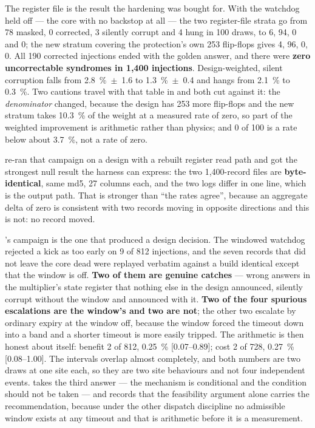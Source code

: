 The register file is the result the hardening was bought for. With the
watchdog held off --- the core with no backstop at all --- the two
register-file strata go from 78 masked, 0 corrected, 3 silently corrupt
and 4 hung in 100 draws, to 6, 94, 0 and 0; the new stratum covering the
protection's own 253 flip-flops gives 4, 96, 0, 0. All 190 corrected
injections ended with the golden answer, and there were \textbf{zero
uncorrectable syndromes in 1,400 injections}. Design-weighted, silent
corruption falls from \SI{2.8}{\percent}~$\pm$~1.6 to
\SI{1.3}{\percent}~$\pm$~0.4 and hangs from \SI{2.1}{\percent} to
\SI{0.3}{\percent}. Two cautions travel with that table in
 and both cut against it: the \emph{denominator}
changed, because the design has 253 more flip-flops and the new stratum
takes \SI{10.3}{\percent} of the weight at a measured rate of zero, so
part of the weighted improvement is arithmetic rather than physics; and
0 of 100 is a rate below about \SI{3.7}{\percent}, not a rate of zero.

 re-ran that campaign on a design with a rebuilt register read
path and got the strongest null result the harness can express: the two
1,400-record files are \textbf{byte-identical}, same md5, 27 columns
each, and the two logs differ in one line, which is the output path. That
is stronger than ``the rates agree'', because an aggregate delta of zero
is consistent with two records moving in opposite directions and this is
not: no record moved.

's campaign is the one that produced a design decision. The
windowed watchdog rejected a kick as too early on 9 of 812 injections,
and the seven records that did not leave the core dead were replayed
verbatim against a build identical except that the window is off. \textbf{Two of them are genuine
catches} --- wrong answers in the multiplier's state register that
nothing else in the design announced, silently corrupt without the window
and announced with it. \textbf{Two of the four spurious escalations are
the window's and two are not}; the other two escalate by ordinary expiry
at the window off, because the window forced the timeout down into a band
and a shorter timeout is more easily tripped. The arithmetic is then
honest about itself: benefit 2 of 812, \SI{0.25}{\percent}
[0.07--0.89]; cost 2 of 728, \SI{0.27}{\percent} [0.08--1.00]. The
intervals overlap almost completely, and both numbers are two draws at
one site each, so they are two site behaviours and not four independent
events.  takes the third answer --- the mechanism
is conditional and the condition should not be taken --- and records that
the feasibility argument alone carries the recommendation, because under
the other dispatch discipline no admissible window exists at any timeout
and that is arithmetic before it is a measurement.


